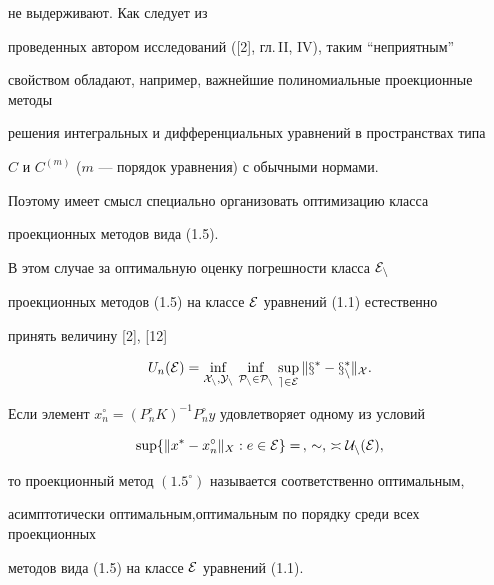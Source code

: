 не выдерживают. Как следует из


проведенных автором исследований ([2], гл.\,II, IV), таким ``неприятным''


свойством обладают, например, важнейшие полиномиальные проекционные методы


решения интегральных и дифференциальных уравнений в пространствах типа


$C$ и $C^{(m)}$ ($m$ --- порядок уравнения) с обычными нормами.


Поэтому имеет смысл специально организовать оптимизацию класса


проекционных методов вида (1.5).


В этом случае за оптимальную оценку погрешности класса $\cal E_n$


проекционных методов (1.5) на классе $\cal E$ уравнений (1.1) естественно


принять величину [2], [12]


\begin{equation}


U_n(\cal E)=\inf_{\mathstrut X_n, Y_n}\, \inf_{\mathstrut P_n\in \cal P_n}\,


\sup_{e\in \cal E}\|x^*-x_n^*\|_X.


\end{equation}





\begin{defn}


Если элемент $x_n^\circ=(P_n^\circ K)^{-1}


P_n^\circ y$ удовлетворяет одному из условий


\begin{equation}


\sup\{ \|x^*-x_n^\circ \|_X : e\in \cal E\} =\, ,\, \sim ,\, \asymp


U_n(\cal E),


\end{equation}


то проекционный метод $(1.5^\circ)$ называется соответственно оптимальным,


асимптотически оптимальным,оптимальным по порядку среди всех проекционных


методов вида (1.5) на классе $\cal E$ уравнений (1.1).


\end{defn}





